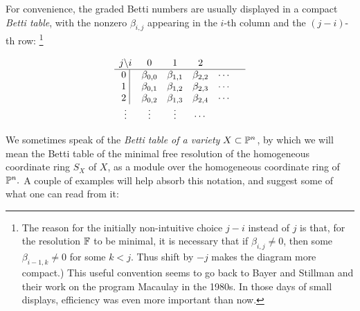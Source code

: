 For convenience, the graded Betti numbers are usually displayed in a compact \emph{Betti table}, with the nonzero $\beta_{i,j}$ appearing in the $i$-th column and the $(j-i)$-th row: \footnote{The reason for the initially non-intuitive choice $j-i$ instead of $j$ is that, for the resolution $\FF$ to be minimal, it is necessary that if $\beta_{i,j}\neq 0$, then some $\beta_{i-1,k}\neq 0$ for some $k<j$. Thus shift by $-j$ makes the diagram more compact.) This useful convention seems to go back to Bayer and Stillman and their work on the program Macaulay in the 1980s. In those days of small displays, efficiency was even more important than now.}
\setcounter{MaxMatrixCols}{13}
\begin{small}
$$
\begin{matrix}
j \backslash i     &0&1&2\\ \hline
\text{0 }\vline &\gb_{0,0}&\gb_{1,1}&\gb_{2,2}&\cdots&\\
\text{1 }\vline &\gb_{0,1}&\gb_{1,2}&\gb_{2,3}&\cdots&\\
\text{2 }\vline &\gb_{0,2}&\gb_{1,3}&\gb_{2,4}&\cdots&\\
\vdots&\vdots&\vdots&\cdots&\\
\end{matrix}
$$
\end{small}
\noindent We sometimes speak of the \emph{Betti table of a variety $X\subset \PP^{n}$}, by which we will mean the Betti table of the minimal free resolution
of the homogeneous coordinate ring $S_{X}$ of $X$, as a module over the homogeneous coordinate ring of $\PP^{n}.$ A couple of examples will help absorb this notation, and suggest some of what one can read from it:


